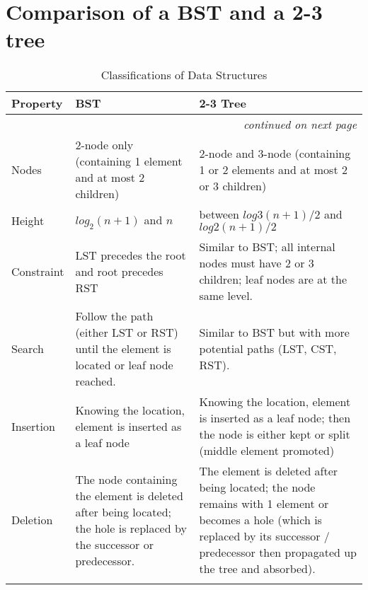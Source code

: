 \section{Comparison of a BST and a 2-3 tree}
    
{\RaggedRight \centering
    \begin{longtable}{p{} p{} p{}}
    \textbf{Property} & \textbf{BST} & \textbf{2-3 Tree}\\
    \hline
    \hline
    \endhead

    \multicolumn{3}{r}{\footnotesize\itshape continued on next page}\\
    \endfoot 

    \endlastfoot

    Nodes & 2-node only (containing 1 element and at most 2 children) & 2-node and 3-node (containing 1 or 2 elements and at most 2 or 3 children)\\
    \hline
    Height & $log_2(n+1)$ and $n$ & between $log3 (n+1)/2$ and $log2 (n+1)/2$\\
    \hline
    Constraint & LST precedes the root and root precedes RST & Similar to BST; all internal nodes must have 2 or 3 children; leaf nodes are at the same level.\\
    \hline
    Search & Follow the path (either LST or RST) until the element is located or leaf node reached. & Similar to BST but with more potential paths (LST, CST, RST).\\
    \hline
    Insertion & Knowing the location, element is inserted as a leaf node & Knowing the location, element is inserted as a leaf node; then the node is either kept or split (middle element promoted)\\
    \hline
    Deletion & The node containing the element is deleted after being located; the hole is replaced by the successor or predecessor. & The element is deleted after being located; the node remains with 1 element or becomes a hole (which is replaced by its successor / predecessor then propagated up the tree and absorbed).\\
    \hline
    
    \caption{Classifications of Data Structures}
    \end{longtable}
    } %

